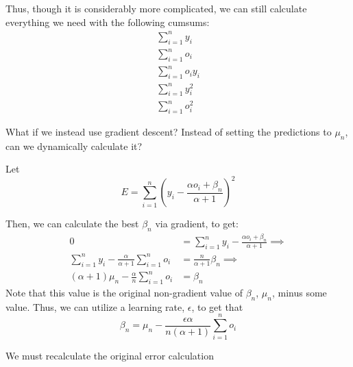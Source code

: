 \documentclass{article}
\begin{document}
Thus, though it is considerably more complicated, we can still calculate everything we need with the following cumsums:
\begin{align*}
    \sum_{i=1}^{n} y_i \\
    \sum_{i=1}^{n} o_i \\
    \sum_{i=1}^{n} o_i y_i \\
    \sum_{i=1}^{n} y_i^2 \\
    \sum_{i=1}^{n} o_i^2 
\end{align*}

What if we instead use gradient descent? Instead of setting the predictions to $\mu_n$, 
can we dynamically calculate it?

Let \[
E = \sum_{i=1}^n (y_i - \frac{\alpha o_i + \beta_n}{\alpha + 1})^2 
\]   

Then, we can calculate the best $\beta_n$ via gradient, to get:
\begin{align*}
    0 &= \sum_{i=1}^n y_i - \frac{\alpha o_i + \beta_n}{\alpha + 1} \implies \\
    \sum_{i=1}^n y_i - \frac{\alpha}{\alpha + 1} \sum_{i=1}^{n} o_i &= \frac{n}{\alpha + 1}\beta_n  \implies \\
    (\alpha + 1)\mu_n - \frac{\alpha}{n} \sum_{i=1}^{n} o_i &= \beta_n
\end{align*}
Note that this value is the original non-gradient value of $\beta_n$, $\mu_n$, 
minus some value. Thus, we can utilize a learning rate, $\epsilon$, to get that \[
\beta_n = \mu_n - \frac{\epsilon \alpha}{n(\alpha + 1)} \sum_{i=1}^{n} o_i\]

We must recalculate the original error calculation
\end{document}

